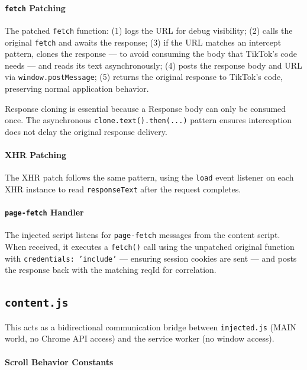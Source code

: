 \paragraph{\textbf{\texttt{fetch} Patching}}

The patched \texttt{fetch} function: (1) logs the URL for debug visibility; (2) calls the original \texttt{fetch} and awaits the response; (3) if the URL matches an intercept pattern, clones the response — to avoid consuming the body that TikTok's code needs — and reads its text asynchronously; (4) posts the response body and URL via \texttt{window.postMessage}; (5) returns the original response to TikTok's code, preserving normal application behavior.

Response cloning is essential because a Response body can only be consumed once. The asynchronous \texttt{clone.text().then(...)} pattern ensures interception does not delay the original response delivery.

\paragraph{\textbf{XHR Patching}}

The XHR patch follows the same pattern, using the \texttt{load} event listener on each XHR instance to read \texttt{responseText} after the request completes.

\paragraph{\textbf{\texttt{page-fetch} Handler}}

The injected script listens for \texttt{page-fetch} messages from the content script. When received, it executes a \texttt{fetch()} call using the unpatched original function with \texttt{credentials: 'include'} — ensuring session cookies are sent — and posts the response back with the matching reqId for correlation.

\subsection{\texttt{content.js}}

This acts as a bidirectional communication bridge between \texttt{injected.js} (MAIN world, no Chrome API access) and the service worker (no window access).

\paragraph{\textbf{Scroll Behavior Constants}}

